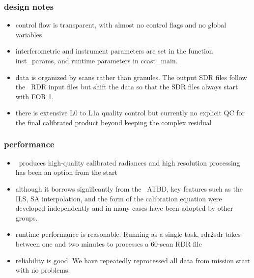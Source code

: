 \documentclass[11pt]{beamer}
\begin{document}
\begin{frame}
\frametitle{design notes}

\begin{itemize}

  \item control flow is transparent, with almost no control flags
    and no global variables

  \item interferometric and instrument parameters are set in the
    function inst\_params, and runtime parameters in ccast\_main.

  \item data is organized by scans rather than granules.  The output
    SDR files follow the \noaa\ RDR input files but shift the data
    so that the SDR files always start with FOR 1.
   
  \item there is extensive L0 to L1a quality control but currently
    no explicit QC for the final calibrated product beyond keeping
    the complex residual

\end{itemize}

\end{frame}
\begin{frame}
\frametitle{performance}

\begin{itemize} 
  \item \ccast\ produces high-quality calibrated radiances and high
    resolution processing has been an option from the start

  \item although it borrows significantly from the \noaa\ ATBD, key
    features such as the ILS, SA interpolation, and the form of the
    calibration equation were developed independently and in many
    cases have been adopted by other groups.

  \item runtime performance is reasonable.  Running as a single
    task, rdr2sdr takes between one and two minutes to processes 
    a 60-scan RDR file

  \item reliability is good.  We have repeatedly reprocessed all
    data from mission start with no problems.

\end{itemize} 

\end{frame}
\end{document}
